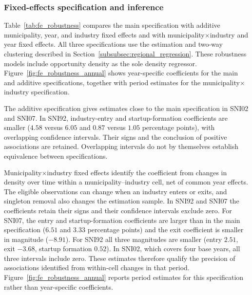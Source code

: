 \documentclass[9pt,twoside]{pnas-new}
\begin{document}
\subsubsection{Fixed-effects specification and inference}
\label{subsubsec:fe-robustness}

Table~\ref{tab:fe_robustness} compares the main specification with additive municipality, year, and industry fixed effects and with municipality$\times$industry and year fixed effects. All three specifications use the estimation and two-way clustering described in Section~\ref{subsubsec:regional_regression}. These robustness models include opportunity density as the sole density regressor. Figure~\ref{fig:fe_robustness_annual} shows year-specific coefficients for the main and additive specifications, together with period estimates for the municipality$\times$industry specification.

The additive specification gives estimates close to the main specification in SNI02 and SNI07. In SNI92, industry-entry and startup-formation coefficients are smaller ($4.58$ versus $6.05$ and $0.87$ versus $1.05$ percentage points), with overlapping confidence intervals. Their signs and the conclusion of positive associations are retained. Overlapping intervals do not by themselves establish equivalence between specifications.

Municipality$\times$industry fixed effects identify the coefficient from changes in density over time within a municipality--industry cell, net of common year effects. The eligible observations can change when an industry enters or exits, and singleton removal also changes the estimation sample. In SNI92 and SNI07 the coefficients retain their signs and their confidence intervals exclude zero. For SNI07, the entry and startup-formation coefficients are larger than in the main specification ($6.51$ and $3.33$ percentage points) and the exit coefficient is smaller in magnitude ($-8.91$). For SNI92 all three magnitudes are smaller (entry $2.51$, exit $-3.68$, startup formation $0.52$). In SNI02, which covers four base years, all three intervals include zero. These estimates therefore qualify the precision of associations identified from within-cell changes in that period. Figure~\ref{fig:fe_robustness_annual} reports period estimates for this specification rather than year-specific coefficients.

\end{document}
